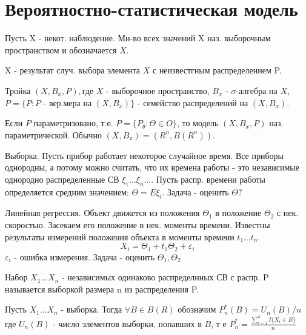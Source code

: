 \documentclass{article}
\begin{document}
 
	\section{Вероятностно-статистическая модель}
	
	\begin{definition}
		Пусть X - некот. наблюдение. Мн-во всех значений X наз. выборочным пространством и обозначается $X$.
	\end{definition}
	X - результат случ. выбора элемента $X$ с неизвестгным распределением P.
	
	\begin{definition}
		Тройка $(X, B_x, P), $где $X$ - выборочное пространство, $B_x$ - $\sigma$-алгебра на $X$,
		$P = \{P: P$ - вер.мера на $(X, B_x)\}$ - семейство распределений  на $(X, B_x)$.
		
	\end{definition}
	
	Если $P$ параметризовано, т.е. $P = \{P_\theta: \Theta \in O\}$, то модель $(X,B_x,P)$ наз. параметрической.
	Обычно $(X,B_x)=(R^n,B(R^n))$.
	
	\begin{example}
			Выборка. Пусть прибор работает некоторое случайное время. Все приборы однородны, а потому можно считать, что их времена работы - 
			это независимые однородно распределенные СВ $\xi_1 \ldots \xi_n \ldots$.
			Пусть распр. времени работы определяется средним значением: $\Theta = E\xi_i$.
			Задача - оценить $\Theta ?$
	\end{example}
	
	\begin{example}
		Линейная регрессия. Объект движется из положения $\Theta_1$ в положение $\Theta_2$ с нек. скоростью.
		Засекаем его положение в нек. моменты времени. Известны результаты измерений положения объекта в моменты времени 
		$t_1 \ldots t_n$.
		$$X_i = \Theta_1 + t_1\Theta_2 + \varepsilon_i$$
		$\varepsilon_i$ - ошибка измерения.
		Задача - оценить $\Theta_1, \Theta_2$
	\end{example}
	
	\begin{definition}
		Набор $X_1 \dots X_n$ - независимых одинаково распределнных СВ с распр. P называется выборкой размера n из распределения P. 
	\end{definition}
	
	\begin{definition}
		Пусть $X_1 \ldots X_n$ - выборка. Тогда $\forall B \in B(R)$ обозначим $P_n^*(B)=U_n(B)/n$
		где $U_n(B)$ - число элементов выборки, попавших в $B$, т е 
		$P_n^* = \frac{\sum_{i=1}^n I\{X_i \in B\}}{n}$
	\end{definition}
	
\end{document}
